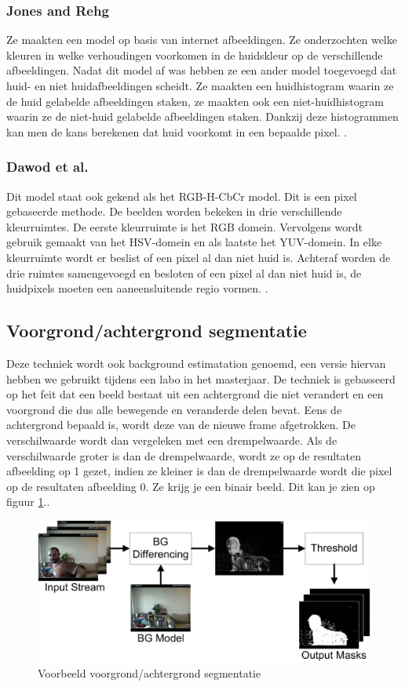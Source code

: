 \subsubsection{Jones and Rehg}
Ze maakten een model op basis van internet afbeeldingen. Ze onderzochten welke kleuren in welke verhoudingen voorkomen in de huidskleur op de verschillende afbeeldingen. Nadat dit model af was hebben ze een ander model toegevoegd dat huid- en niet huidafbeeldingen scheidt. Ze maakten een huidhistogram waarin ze de huid gelabelde afbeeldingen staken, ze maakten ook een niet-huidhistogram waarin ze de niet-huid gelabelde afbeeldingen staken. Dankzij deze histogrammen kan men de kans berekenen dat huid voorkomt in een bepaalde pixel. \cite{bibTHK}.

\subsubsection{Dawod et al.}
Dit model staat ook gekend als het RGB-H-CbCr model. Dit is een pixel gebaseerde methode. De beelden worden bekeken in drie verschillende kleurruimtes. De eerste kleurruimte is het RGB domein. Vervolgens wordt gebruik gemaakt van het HSV-domein en als laatste het YUV-domein. In elke kleurruimte wordt er beslist of een pixel al dan niet huid is. Achteraf worden de drie ruimtes samengevoegd en besloten of een pixel al dan niet huid is, de huidpixels moeten een aaneensluitende regio vormen. \cite{bibTHK}.

\subsection{Voorgrond/achtergrond segmentatie}
\label{refBET}
Deze techniek wordt ook background estimatation genoemd, een versie hiervan hebben we gebruikt tijdens een labo in het masterjaar. De techniek is gebasseerd op het feit dat een beeld bestaat uit een achtergrond die niet verandert en een voorgrond die dus alle bewegende en veranderde delen bevat. Eens de achtergrond bepaald is, wordt deze van de nieuwe frame afgetrokken. De verschilwaarde wordt dan vergeleken met een drempelwaarde. Als de verschilwaarde groter is dan de drempelwaarde, wordt ze op de resultaten afbeelding op 1 gezet, indien ze kleiner is dan de  drempelwaarde wordt die pixel op de resultaten afbeelding 0. Ze krijg je een binair beeld. Dit kan je zien op figuur \ref{imgVAS}.\cite{bibVAS}.

\begin{figure}[h]
	\includegraphics[scale=0.65]{BackgroundSegmentation}
	\caption{Voorbeeld voorgrond/achtergrond segmentatie}
	\label{imgVAS}
\end{figure}

